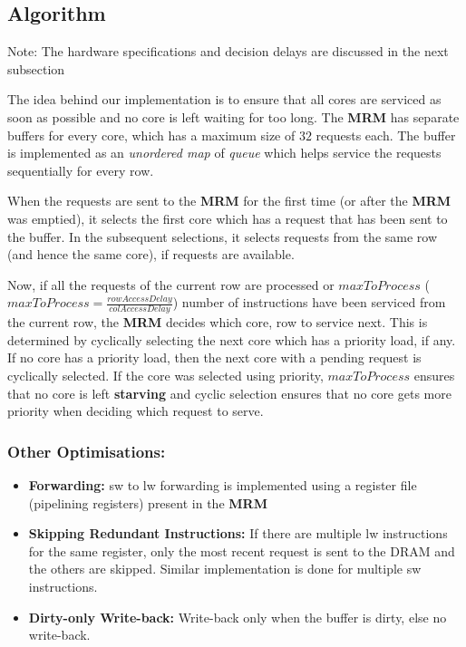 \documentclass{article}
\begin{document}
\subsection{Algorithm}
Note: The hardware specifications and decision delays are discussed in the next subsection\par
The idea behind our implementation is to ensure that all cores are serviced as soon as possible and no core is left waiting for too long. The \textbf{MRM} has separate buffers for every core, which has a maximum size of $32$ requests each. The buffer is implemented as an \textit{unordered map} of \textit{queue} which helps service the requests sequentially for every row.\par
When the requests are sent to the \textbf{MRM} for the first time (or after the \textbf{MRM} was emptied), it selects the first core which has a request that has been sent to the buffer. In the subsequent selections, it selects requests from the same row (and hence the same core), if requests are available.\par
Now, if all the requests of the current row are processed or $maxToProcess$ ($maxToProcess = \frac{rowAccessDelay}{colAccessDelay}$) number of instructions have been serviced from the current row, the \textbf{MRM} decides which core, row to service next. This is determined by cyclically selecting the next core which has a priority load, if any. If no core has a priority load, then the next core with a pending request is cyclically selected. If the core was selected using priority, $maxToProcess$ ensures that no core is left \textbf{starving} and cyclic selection ensures that no core gets more priority when deciding which request to serve.
\subsubsection*{Other Optimisations:}
\begin{itemize}
    \item \textbf{Forwarding:} sw to lw forwarding is implemented using a register file (pipelining registers) present in the \textbf{MRM}
    \item \textbf{Skipping Redundant Instructions:} If there are multiple lw instructions for the same register, only the most recent request is sent to the DRAM and the others are skipped. Similar implementation is done for multiple sw instructions.
    \item \textbf{Dirty-only Write-back:} Write-back only when the buffer is dirty, else no write-back.
\end{itemize}
\end{document}
